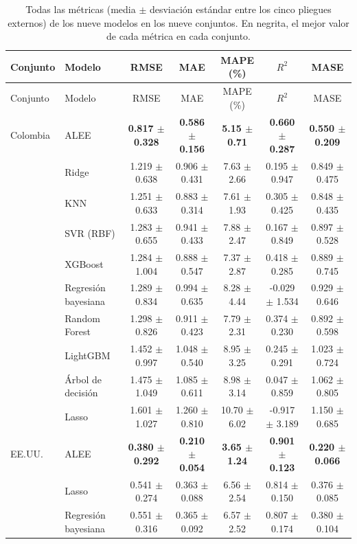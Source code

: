 \begin{longtable}{llccccc}
\caption{Todas las métricas (media $\pm$ desviación estándar entre los cinco pliegues externos) de los nueve modelos en los nueve conjuntos. En negrita, el mejor valor de cada métrica en cada conjunto.}\label{tab:metricas}\\
\toprule
Conjunto & Modelo & RMSE & MAE & MAPE (\%) & $R^2$ & MASE \\
\midrule
\endfirsthead
\toprule
Conjunto & Modelo & RMSE & MAE & MAPE (\%) & $R^2$ & MASE \\
\midrule
\endhead
\bottomrule
\endfoot
Colombia & ALEE & \textbf{0.817 $\pm$ 0.328} & \textbf{0.586 $\pm$ 0.156} & \textbf{5.15 $\pm$ 0.71} & \textbf{0.660 $\pm$ 0.287} & \textbf{0.550 $\pm$ 0.209} \\
 & Ridge & 1.219 $\pm$ 0.638 & 0.906 $\pm$ 0.431 & 7.63 $\pm$ 2.66 & 0.195 $\pm$ 0.947 & 0.849 $\pm$ 0.475 \\
 & KNN & 1.251 $\pm$ 0.633 & 0.883 $\pm$ 0.314 & 7.61 $\pm$ 1.93 & 0.305 $\pm$ 0.425 & 0.848 $\pm$ 0.435 \\
 & SVR (RBF) & 1.283 $\pm$ 0.655 & 0.941 $\pm$ 0.433 & 7.88 $\pm$ 2.47 & 0.167 $\pm$ 0.849 & 0.897 $\pm$ 0.528 \\
 & XGBoost & 1.284 $\pm$ 1.004 & 0.888 $\pm$ 0.547 & 7.37 $\pm$ 2.87 & 0.418 $\pm$ 0.285 & 0.889 $\pm$ 0.745 \\
 & Regresión bayesiana & 1.289 $\pm$ 0.834 & 0.994 $\pm$ 0.635 & 8.28 $\pm$ 4.44 & -0.029 $\pm$ 1.534 & 0.929 $\pm$ 0.646 \\
 & Random Forest & 1.298 $\pm$ 0.826 & 0.911 $\pm$ 0.423 & 7.79 $\pm$ 2.31 & 0.374 $\pm$ 0.230 & 0.892 $\pm$ 0.598 \\
 & LightGBM & 1.452 $\pm$ 0.997 & 1.048 $\pm$ 0.540 & 8.95 $\pm$ 3.25 & 0.245 $\pm$ 0.291 & 1.023 $\pm$ 0.724 \\
 & Árbol de decisión & 1.475 $\pm$ 1.049 & 1.085 $\pm$ 0.611 & 8.98 $\pm$ 3.14 & 0.047 $\pm$ 0.859 & 1.062 $\pm$ 0.805 \\
 & Lasso & 1.601 $\pm$ 1.027 & 1.260 $\pm$ 0.810 & 10.70 $\pm$ 6.02 & -0.917 $\pm$ 3.189 & 1.150 $\pm$ 0.685 \\
\midrule
EE.UU. & ALEE & \textbf{0.380 $\pm$ 0.292} & \textbf{0.210 $\pm$ 0.054} & \textbf{3.65 $\pm$ 1.24} & \textbf{0.901 $\pm$ 0.123} & \textbf{0.220 $\pm$ 0.066} \\
 & Lasso & 0.541 $\pm$ 0.274 & 0.363 $\pm$ 0.088 & 6.56 $\pm$ 2.54 & 0.814 $\pm$ 0.150 & 0.376 $\pm$ 0.085 \\
 & Regresión bayesiana & 0.551 $\pm$ 0.316 & 0.365 $\pm$ 0.092 & 6.57 $\pm$ 2.52 & 0.807 $\pm$ 0.174 & 0.380 $\pm$ 0.104 \\

\end{longtable}
